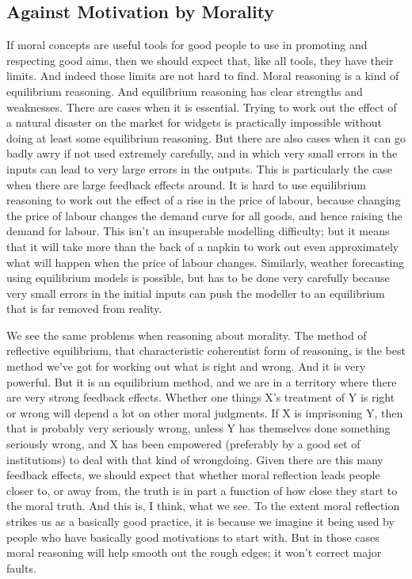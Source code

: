 \documentclass[
  10pt,
  letterpaper,
  twoside]{scrbook}
\begin{document}
\subsection{Against Motivation by
Morality}\label{againstmotivationbymorality}

If moral concepts are useful tools for good people to use in promoting
and respecting good aims, then we should expect that, like all tools,
they have their limits. And indeed those limits are not hard to find.
Moral reasoning is a kind of equilibrium reasoning. And equilibrium
reasoning has clear strengths and weaknesses. There are cases when it is
essential. Trying to work out the effect of a natural disaster on the
market for widgets is practically impossible without doing at least some
equilibrium reasoning. But there are also cases when it can go badly
awry if not used extremely carefully, and in which very small errors in
the inputs can lead to very large errors in the outputs. This is
particularly the case when there are large feedback effects around. It
is hard to use equilibrium reasoning to work out the effect of a rise in
the price of labour, because changing the price of labour changes the
demand curve for all goods, and hence raising the demand for labour.
This isn't an insuperable modelling difficulty; but it means that it
will take more than the back of a napkin to work out even approximately
what will happen when the price of labour changes. Similarly, weather
forecasting using equilibrium models is possible, but has to be done
very carefully because very small errors in the initial inputs can push
the modeller to an equilibrium that is far removed from reality.

We see the same problems when reasoning about morality. The method of
reflective equilibrium, that characteristic coherentist form of
reasoning, is the best method we've got for working out what is right
and wrong. And it is very powerful. But it is an equilibrium method, and
we are in a territory where there are very strong feedback effects.
Whether one things X's treatment of Y is right or wrong will depend a
lot on other moral judgments. If X is imprisoning Y, then that is
probably very seriously wrong, unless Y has themselves done something
seriously wrong, and X has been empowered (preferably by a good set of
institutions) to deal with that kind of wrongdoing. Given there are this
many feedback effects, we should expect that whether moral reflection
leads people closer to, or away from, the truth is in part a function of
how close they start to the moral truth. And this is, I think, what we
see. To the extent moral reflection strikes us as a basically good
practice, it is because we imagine it being used by people who have
basically good motivations to start with. But in those cases moral
reasoning will help smooth out the rough edges; it won't correct major
faults.
\end{document}
